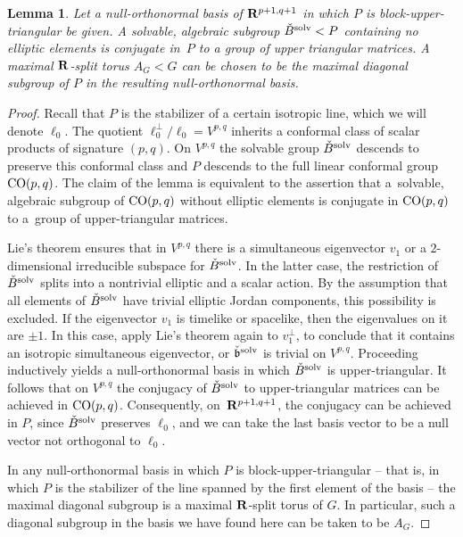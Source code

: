 \documentclass[pdftex]{sigma}
\numberwithin{equation}{section}
\newtheorem{lem}[thm]{Lemma}
\theoremstyle{definition}
\newcommand{\BR}{{\bf R}}
\def\b{{\mathfrak b}}
\begin{document}
\begin{lem}
\label{lem.solvable.in.p}
Let a null-orthonormal basis of $\BR^{p+1,q+1}$ in which $P$ is block-upper-triangular
be given. A solvable, algebraic
subgroup $\check{B}^{\rm solv} < P$ containing no elliptic elements is conjugate in~$P$ to a group of upper triangular matrices.
A maximal $\BR$-split torus $A_G < G$ can be chosen to be the maximal diagonal subgroup of $P$ in the resulting null-orthonormal basis.
\end{lem}

\begin{proof}
Recall that $P$ is the stabilizer of a certain isotropic line, which we will denote $\ell_0$. The quotient $\ell_0^\perp/\ell_0 = V^{p,q}$ inherits a conformal class of
scalar products of signature $(p,q)$. On $V^{p,q}$ the solvable group $\check{B}^{\rm solv}$ descends to preserve this conformal class and $P$ descends to the full linear conformal group ${\rm CO}(p,q)$. The claim of the lemma is equivalent to the assertion that
a~solvable, algebraic subgroup of ${\rm CO}(p,q)$ without elliptic elements is conjugate in ${\rm CO}(p,q)$ to a~group of upper-triangular matrices.


Lie's theorem ensures that in $V^{p,q}$ there is a simultaneous eigenvector $v_1$ or a $2$-dimensional irreducible subspace for $\check{B}^{\rm solv}$. In the latter case, the restriction of $\check{B}^{\rm solv}$ splits into a nontrivial elliptic and a scalar action. By the assumption that all elements of $\check{B}^{\rm solv}$ have trivial elliptic Jordan components, this possibility is excluded. If the eigenvector $v_1$ is timelike or spacelike, then the eigenvalues on it are $\pm 1$. In this case,
apply Lie's theorem again to $v_1^\perp$, to conclude that it contains an isotropic simultaneous eigenvector, or $\check{\b}^{\rm solv}$ is trivial on $V^{p,q}$. Proceeding inductively yields a null-orthonormal basis in which $\check{B}^{\rm solv}$ is upper-triangular. It follows that on $V^{p,q}$ the conjugacy of $\check{B}^{\rm solv}$ to upper-triangular matrices can be achieved in ${\rm CO}(p,q)$. Consequently, on~$\BR^{p+1,q+1}$, the conjugacy can be achieved in $P$, since $\check{B}^{\rm solv}$ preserves $\ell_0$, and we can take the last basis vector to be a null vector not orthogonal to $\ell_0$.

In any null-orthonormal basis in which $P$ is block-upper-triangular -- that is, in which $P$ is the stabilizer of the line spanned by the first element of the basis -- the maximal diagonal subgroup is a maximal $\BR$-split torus of $G$. In particular, such a diagonal subgroup in the basis we have found here can be taken to be $A_G$.
\end{proof}
\end{document}
